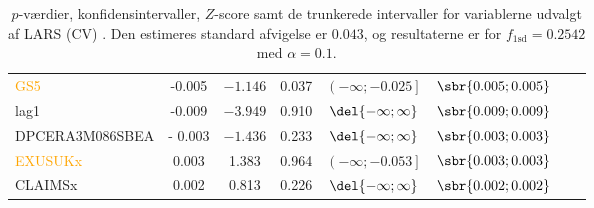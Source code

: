 \begin{table}[ht]
{\begin{tabular}{lccccccc}
\textcolor{orange}{GS5} & -0.005 & $-1.146 $ &0.037 &     $\left( -\infty ;  -0.025\right]   $ & $\sbr{0.005 ;0.005 }$\\  
 \textcolor{blue3}{lag1}  & -0.009  &$-3.949$   & 0.910   & $\del{-\infty  ;  \infty }$  &$\sbr{0.009; 0.009 }$ \\ 
 \textcolor{red3}{DPCERA3M086SBEA} &- 0.003 & $-1.436$ & 0.233  &   $\del{-\infty   ;  \infty }$ &  $\sbr{0.003; 0.003}$ \\ 
\textcolor{orange}{ EXUSUKx}  &  0.003   &1.383 & 0.964   &   $\left( -\infty     ;-0.053 \right] $&  $\sbr{0.003; 0.003 }$   \\   
 \textcolor{blue3}{CLAIMSx} &0.002 &  0.813   & 0.226 &    $\del{-\infty  ;  \infty}$& $\sbr{0.002 ;0.002 }$   \\ 
\bottomrule
\end{tabular}  
}
\caption{\(p\)-værdier, konfidensintervaller, $Z$-score samt de trunkerede intervaller for variablerne udvalgt af LARS (CV) . Den estimeres standard afvigelse er \(0.043\), og resultaterne er for \(f_{1 \text{sd}} = 0.2542\) med \(\alpha = 0.1\).} \label{tab:larInf_kryds}
\end{table} 
